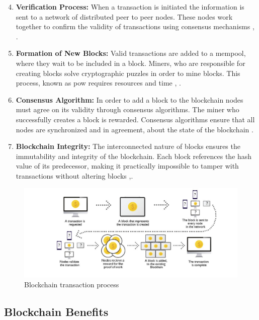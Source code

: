 \begin{enumerate}
    \setcounter{enumi}{3}
    \item \textbf{Verification Process:} When a transaction is initiated the information is sent to a network of distributed peer to peer nodes. These nodes work together 
    to confirm the validity of transactions using consensus mechanisms \cite{9036241}, \cite{geeksforgeeks}.
    \item \textbf{Formation of New Blocks:} Valid transactions are added to a \gls{mempool}, where they wait to be included in a block. Miners, who are responsible 
    for creating blocks solve cryptographic puzzles in order to mine blocks. This process, known as \gls{pow} requires resources and time \cite{9596538}, \cite{geeksforgeeks}.
    \item \textbf{Consensus Algorithm:} In order to add a block to the blockchain nodes must agree on its validity through consensus algorithms. The miner who successfully 
    creates a block is rewarded. Consensus algorithms ensure that all nodes are synchronized and in agreement, about the state of the blockchain \cite{geeksforgeeks}.
    \item \textbf{Blockchain Integrity:} The interconnected nature of blocks ensures the immutability and integrity of the blockchain. Each block references the hash value 
    of its predecessor, making it practically impossible to tamper with transactions without altering blocks \cite{9596538} ,\cite{9036241}.
\end{enumerate}

\begin{figure}[h]  
  \centering
  \includegraphics[width=1\textwidth]{Images/c2_2.png} 
  \caption{Blockchain transaction process}
\end{figure}

\subsection{Blockchain Benefits}

